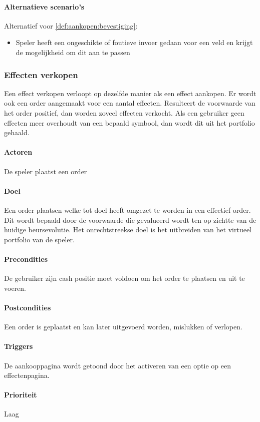 \paragraph{Alternatieve scenario’s}
Alternatief voor \ref{def:aankopen:bevestiging}:
\begin{itemize}
 \item Speler heeft een ongeschikte of foutieve invoer gedaan voor een veld en krijgt de mogelijkheid om dit aan te passen
\end{itemize}

\subsubsection{Effecten verkopen}
Een effect verkopen verloopt op dezelfde manier als een effect aankopen. Er wordt ook een order aangemaakt voor een aantal effecten. Resulteert de voorwaarde van het order positief, dan worden zoveel effecten verkocht. Als een gebruiker geen effecten meer overhoudt van een bepaald symbool, dan wordt dit uit het portfolio gehaald.
\paragraph{Actoren} De speler plaatst een order
\paragraph{Doel} Een order plaatsen welke tot doel heeft omgezet te worden in een effectief order. Dit wordt bepaald door de voorwaarde die gevalueerd wordt ten op zichtte van de huidige beursevolutie. Het onrechtstreekse doel is het uitbreiden van het virtueel portfolio van de speler.
\paragraph{Precondities} De gebruiker zijn cash positie moet voldoen om het order te plaatsen en uit te voeren.
\paragraph{Postcondities} Een order is geplaatst en kan later uitgevoerd worden, mislukken of verlopen.
\paragraph{Triggers} De aankooppagina wordt getoond door het activeren van een optie op een effectenpagina.
\paragraph{Prioriteit}Laag
